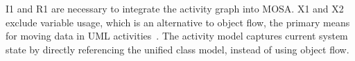 
\noindent I1 and R1 are necessary to integrate the activity graph into MOSA. X1 and X2 exclude variable usage, which is an alternative to object flow, the primary means for moving data in UML activities~\cite[p.~377]{omg_unified_2017}. The \agl activity model captures current system state by directly referencing the unified class model, instead of using object flow.

